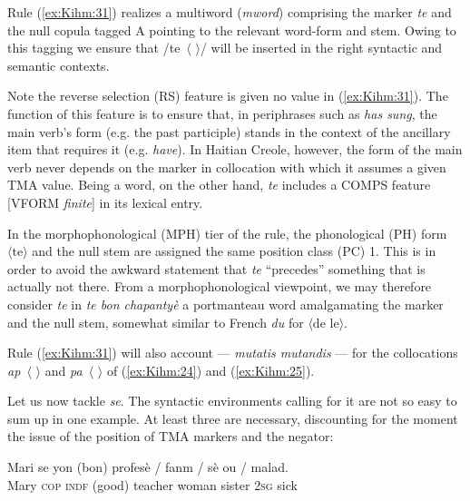 \documentclass[output=paper]{langsci/langscibook}
\begin{document}
\z

Rule (\ref{ex:Kihm:31}) realizes a multiword (\emph{mword}) comprising the marker
\emph{te} and the null copula tagged A pointing to the relevant
word-form and stem. Owing to this tagging we ensure that /te~$\langle\,\,\rangle$/ will
be inserted in the right syntactic and semantic contexts.

Note the reverse selection (RS) feature is given no value in (\ref{ex:Kihm:31}). The
function of this feature is to ensure that, in periphrases such as
\emph{has sung}, the main verb's form (e.g. the past participle) stands
in the context of the ancillary item that requires it (e.g.
\emph{have}). In Haitian Creole, however, the form of the main verb
never depends on the marker in collocation with which it assumes a given
TMA value. Being a word, on the other hand, \emph{te} includes a COMPS
feature {[}VFORM \emph{finite}{]} in its lexical entry.

In the morphophonological (MPH) tier of the rule, the phonological (PH)
form $\langle\text{te}\rangle$ and the null stem are assigned the same position class (PC) 1.
This is in order to avoid the awkward statement that \emph{te}
``precedes'' something that is actually not there. From a
morphophonological viewpoint, we may therefore consider \emph{te} in
\emph{te bon chapantyè} a portmanteau word amalgamating the marker and
the null stem, somewhat similar to French \emph{du} for $\langle\text{de le}\rangle$.

Rule (\ref{ex:Kihm:31}) will also account --- \emph{mutatis mutandis} --- for the
collocations \emph{ap~$\langle\,\,\rangle$} and \emph{pa~$\langle\,\,\rangle$} of (\ref{ex:Kihm:24}) and (\ref{ex:Kihm:25}).

Let us now tackle \emph{se}. The syntactic environments calling for it
are not so easy to sum up in one example. At least three are necessary,
discounting for the moment the issue of the position of TMA markers and
the negator:

\ea\label{ex:Kihm:32} \gll Mari se yon (bon) profesè  /  fanm / sè ou / malad.\\
Mary \textsc{cop} \textsc{indf} (good) teacher {} woman {} sister \textsc{2sg} {} sick \\
\glt {} \\
\end{document}
